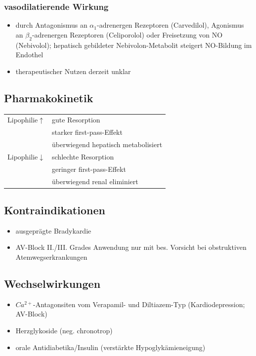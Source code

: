 \documentclass[10pt,a4paper]{report}
\begin{document}
\subsubsection{vasodilatierende Wirkung}
\begin{itemize}
	\item durch Antagonismus an $\alpha_1$-adrenergen Rezeptoren (Carvedilol), Agonismus an $\beta_2$-adrenergen Rezeptoren (Celiporolol) oder Freisetzung von NO (Nebivolol); hepatisch gebildeter Nebivolon-Metabolit steigert NO-Bildung im Endothel
	\item therapeutischer Nutzen derzeit unklar
\end{itemize}
\subsection{Pharmakokinetik}
\begin{tabularx}{\textwidth}{XX}
Lipophilie$\uparrow$&gute Resorption\\
&starker first-pass-Effekt\\
&überwiegend hepatisch metabolisiert\\
Lipophilie$\downarrow$&schlechte Resorption\\
&geringer first-pass-Effekt\\
&überwiegend renal eliminiert\\
\end{tabularx}
\subsection{Kontraindikationen}
\begin{itemize}
	\item ausgeprägte Bradykardie
	\item AV-Block II./III. Grades Anwendung nur mit bes. Vorsicht bei obstruktiven Atemwegserkrankungen
\end{itemize}
\subsection{Wechselwirkungen}
\begin{itemize}
	\item $Ca^{2+}$-Antagonsiten vom Verapamil- und Diltiazem-Typ (Kardiodepression; AV-Block)
	\item Herzglykoside (neg. chronotrop)
	\item orale Antidiabetika/Insulin (verstärkte Hypoglykämieneigung)
\end{itemize}
\end{document}

